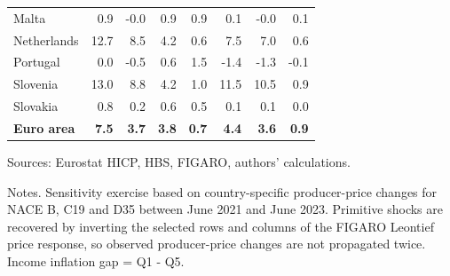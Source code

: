 \begin{table}[H]
\begin{tabular}{lrrrrrrr}
Malta & 0.9 & -0.0 & 0.9 & 0.9 & 0.1 & -0.0 & 0.1
 \\
Netherlands & 12.7 & 8.5 & 4.2 & 0.6 & 7.5 & 7.0 & 0.6
 \\
Portugal & 0.0 & -0.5 & 0.6 & 1.5 & -1.4 & -1.3 & -0.1
 \\
Slovenia & 13.0 & 8.8 & 4.2 & 1.0 & 11.5 & 10.5 & 0.9
 \\
Slovakia & 0.8 & 0.2 & 0.6 & 0.5 & 0.1 & 0.1 & 0.0
 \\
\midrule
\textbf{Euro area} & \textbf{7.5} & \textbf{3.7} & \textbf{3.8} & \textbf{0.7} & \textbf{4.4} & \textbf{3.6} & \textbf{0.9}
 \\
\bottomrule
\end{tabular}
\par\vspace{0.35em}\footnotesize\noindent Sources: Eurostat HICP, HBS, FIGARO, authors' calculations.
\par\vspace{0.25em}\footnotesize\noindent Notes. Sensitivity exercise based on country-specific producer-price changes for NACE B, C19 and D35 between June 2021 and June 2023. Primitive shocks are recovered by inverting the selected rows and columns of the FIGARO Leontief price response, so observed producer-price changes are not propagated twice. Income inflation gap = Q1 - Q5.
\end{table}
\vspace{0.6em}
